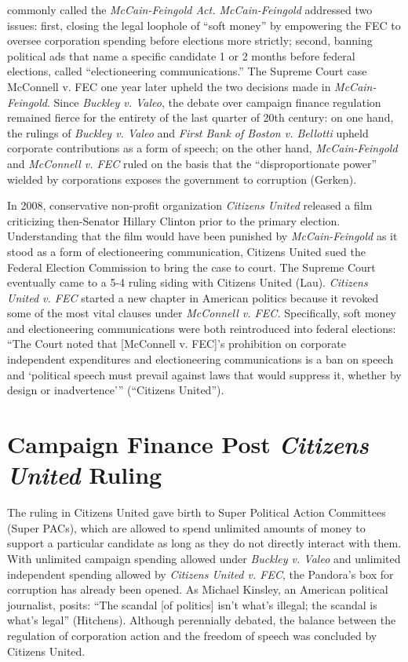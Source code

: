 commonly called the \emph{McCain-Feingold Act. McCain-Feingold} addressed two issues: first, closing the legal loophole of “soft money” by empowering the FEC to oversee corporation spending before elections more strictly; second, banning political ads that name a specific candidate 1 or 2 months before federal elections, called “electioneering communications.” The Supreme Court case McConnell v. FEC one year later upheld the two decisions made in \emph{McCain-Feingold}. Since \emph{Buckley v. Valeo}, the debate over campaign finance regulation remained fierce for the entirety of the last quarter of 20th century: on one hand, the rulings of \emph{Buckley v. Valeo} and \emph{First Bank of Boston v. Bellotti} upheld corporate contributions as a form of speech; on the other hand, \emph{McCain-Feingold} and \emph{McConnell v. FEC} ruled on the basis that the “disproportionate power” wielded by corporations exposes the government to corruption (Gerken). 

In 2008, conservative non-profit organization \emph{Citizens United} released a film criticizing then-Senator Hillary Clinton prior to the primary election. Understanding that the film would have been punished by \emph{McCain-Feingold} as it stood as a form of electioneering communication, Citizens United sued the Federal Election Commission to bring the case to court. The Supreme Court eventually came to a 5-4 ruling siding with Citizens United (Lau). \emph{Citizens United v. FEC} started a new chapter in American politics because it revoked some of the most vital clauses under \emph{McConnell v. FEC.} Specifically, soft money and electioneering communications were both reintroduced into federal elections: “The Court noted that [McConnell v. FEC]’s prohibition on corporate independent expenditures and electioneering communications is a ban on speech and ‘political speech must prevail against laws that would suppress it, whether by design or inadvertence’” (“Citizens United”). 

\section{Campaign Finance Post \emph{Citizens United} Ruling}

The ruling in Citizens United gave birth to Super Political Action Committees (Super PACs), which are allowed to spend unlimited amounts of money to support a particular candidate as long as they do not directly interact with them. With unlimited campaign spending allowed under \emph{Buckley v. Valeo} and unlimited independent spending allowed by \emph{Citizens United v. FEC}, the Pandora's box for corruption has already been opened. As Michael Kinsley, an American political journalist, posits: “The scandal [of politics] isn’t what’s illegal; the scandal is what’s legal” (Hitchens). Although perennially debated, the balance between the regulation of corporation action and the freedom of speech was concluded by Citizens United. 

